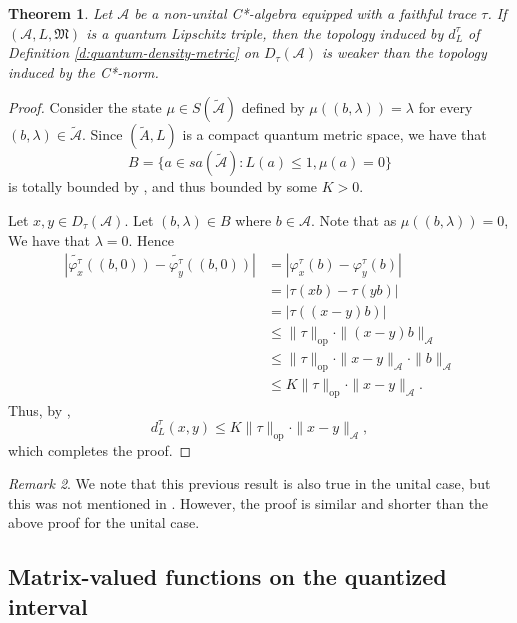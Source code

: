 \documentclass{amsart}
\theoremstyle{plain}
\newtheorem{theorem}{Theorem}[section]
\theoremstyle{definition}
\theoremstyle{remark}
\newtheorem{remark}[theorem]{Remark}
\numberwithin{equation}{section}
\newcommand{\A}{{\mathcal{A}}}
\newcommand{\wt}[1]{{\widetilde{#1}}}
\newcommand{\la}{{\lambda}}
\newcommand{\vhi}{{\varphi}}
\newcommand{\M}{{\mathfrak{M}}}
\renewcommand{\leq}{\leqslant}
\begin{document}
\begin{theorem}\label{t:c*-norm-stronger-qm}
    Let $\A$ be a non-unital C*-algebra equipped with a faithful trace $\tau$. If  $(\A, L,\M)$ is a quantum Lipschitz triple, then the topology induced by $d_L^\tau$ of Definition \ref{d:quantum-density-metric} on $D_\tau(\A)$ is weaker than the topology induced by the C*-norm.
\end{theorem}
\begin{proof}
    Consider the state $\mu \in S(\wt{\A})$ defined by $\mu((b,\la))=\la$ for every $(b,\la)\in \wt{\A}$. Since $(\wt{A}, L)$ is a compact quantum metric space, we have that
    \[
    B=\{a \in sa(\wt{\A}) : L(a)\leq 1, \mu(a)=0\}
    \]
    is totally bounded by \cite[Proposition 1.3]{Ozawa05}, and thus bounded by some $K>0$. 

    Let $x,y\in D_\tau(\A)$. Let $(b,\la)\in B$ where $b\in \A$. Note that as $\mu((b,\la))=0$, We have that $\la=0$. Hence   
    \begin{align*}
        \left|\wt{\vhi_x^\tau}\left((b,0)\right)-\wt{\vhi_y^\tau}\left((b,0)\right) \right|&  = \left| \vhi_x^\tau(b)  - \vhi_y^\tau(b) \right| \\
        & = |\tau(xb)-\tau(yb)|\\
        & = |\tau((x-y)b)|\\
        & \leq \|\tau\|_\mathrm{op}\cdot \|(x-y)b\|_\A\\
        & \leq \|\tau\|_\mathrm{op}\cdot \|x-y\|_\A\cdot \|b\|_\A\\
        & \leq K\|\tau\|_\mathrm{op} \cdot \|x-y\|_\A.
    \end{align*}
    Thus, by \cite[Proposition 2.7]{Latremoliere12b},
    \[
    d_L^\tau(x,y)\leq K\|\tau\|_\mathrm{op} \cdot \|x-y\|_\A,
    \]
    which completes the proof.
\end{proof}
\begin{remark}
    We note that this previous result is also true in the unital case, but this was not mentioned in \cite{Aguilar25}. However, the proof is similar and shorter than the above proof for the unital case.
\end{remark}

 \subsection{Matrix-valued  functions on the quantized interval}\label{s:quantized}
\end{document}
